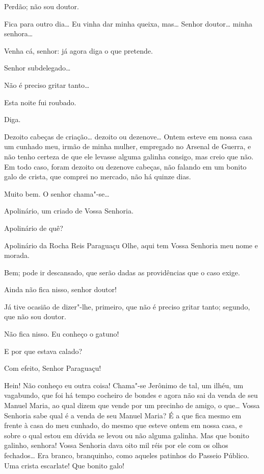 \begin{linenumbers}
 Perdão; não sou doutor.

 Fica para outro dia\ldots{} Eu vinha dar minha queixa, mas\ldots{}
 Senhor doutor\ldots{} minha
senhora\ldots{} 

 Venha cá, senhor: já agora diga o que pretende.

   Senhor subdelegado\ldots{}

 Não é preciso gritar tanto\ldots{}

 Esta noite fui roubado.

 Diga.

 Dezoito cabeças de criação\ldots{} dezoito ou dezenove\ldots{} Ontem
esteve em nossa casa um cunhado
meu, irmão de minha mulher, empregado no Arsenal de Guerra, e não tenho
certeza de que ele levasse alguma
galinha consigo, mas creio que não. Em todo caso, foram dezoito ou
dezenove cabeças, não falando em um
bonito galo de crista, que comprei no mercado, não há quinze dias.

 Muito bem. O senhor chama"-se\ldots{}

 Apolinário, um criado de Vossa Senhoria.

 Apolinário de quê?

 Apolinário da Rocha Reis Paraguaçu  Olhe, aqui tem Vossa Senhoria meu
nome e morada.

 Bem; pode ir descansado, que serão dadas as providências que o
caso exige.

  Ainda não fica nisso,
senhor doutor!

 Já tive ocasião de dizer"-lhe, primeiro, que não é preciso
gritar tanto; segundo, que não sou doutor.

  Não fica
nisso. Eu conheço o gatuno!

 E por que estava calado?

  Com efeito, Senhor
Paraguaçu!

  Hein!  Não conheço eu outra coisa!
Chama"-se Jerônimo de tal, um ilhéu, um vagabundo, que foi há tempo
cocheiro de bondes e agora não sai da
venda de seu Manuel Maria, ao qual dizem que vende por um precinho de
amigo, o que\ldots{} 
Vossa Senhoria sabe qual é a venda de seu Manuel Maria? É a que fica
mesmo em frente à casa do meu
cunhado, do mesmo que esteve ontem em nossa casa, e sobre o qual estou
em dúvida se levou ou não alguma
galinha.  Mas que bonito galinho, senhora! Vossa
Senhoria dava oito mil réis por ele com os olhos
fechados\ldots{} Era branco, branquinho, como aqueles patinhos do Passeio
Público. Uma crista escarlate! Que
bonito galo!


\end{linenumbers}
